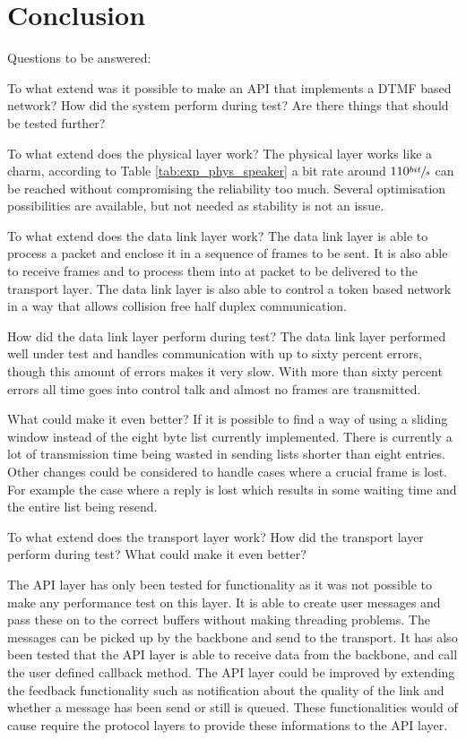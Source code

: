 \chapter{Conclusion}\label{chap:conclusion}
Questions to be answered:

To what extend was it possible to make an API that implements a DTMF based
network?
How did the system perform during test? 
Are there things that should be tested further?

To what extend does the physical layer work? 
The physical layer works like a charm, according to Table \ref{tab:exp_phys_speaker} a bit rate around $110\sfrac{bit}{s}$ can be reached without compromising the reliability too much. Several optimisation possibilities are available, but not needed as stability is not an issue.

  To what extend does the data link layer work? 
The data link layer is able to process a packet and enclose it in a sequence of
frames to be sent. It is also able to receive frames and to process them into at
packet to be delivered to the transport layer. The data link layer is also able
to control a token based network in a way that allows collision free half duplex
communication. 

  How did the data link layer perform during test? The data link
layer performed well under test and handles communication with up to sixty
percent errors, though this amount of errors makes it very slow. With more than
sixty percent errors all time goes into control talk and almost no frames are
transmitted.

  What could make it even better?
If it is possible to find a way of using a sliding window instead of the eight
byte list currently implemented. There is currently a lot of transmission time
being wasted in sending lists shorter than eight entries. Other changes could be
considered to handle cases where a crucial frame is lost. For example the case
where a reply is lost which results in some waiting time and the entire list
being resend.

To what extend does the transport layer work? 
How did the transport layer perform during test?
What could make it even better?

The API layer has only been tested for functionality as it was not possible to make any performance test on this layer. It is able to create user messages and pass these on to the correct buffers without making threading problems. The messages can be picked up by the backbone and send to the transport. It has also been tested that the API layer is able to receive data from the backbone, and call the user defined callback method.
The API layer could be improved by extending the feedback functionality such as notification about the quality of the link and whether a message has been send or still is queued. These functionalities would of cause require the protocol layers to provide these informations to the API layer.


